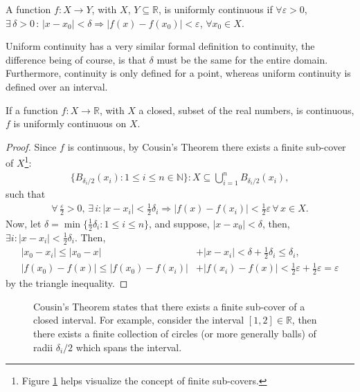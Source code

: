 \begin{definition}
A function $f: X \rightarrow Y$, with $X, \, Y \subseteq \mathbb{R}$, is uniformly continuous if $\forall \varepsilon > 0$, $\exists \, \delta > 0 \, : \, |x-x_0| < \delta \Rightarrow |f(x) - f(x_0)| < \varepsilon$, $ \forall x_0 \in X$.
\end{definition}

Uniform continuity has a very similar formal definition to continuity, the difference being of course, is that  $\delta$ must be the same for the entire domain. Furthermore, continuity is only defined for a point, whereas uniform continuity is defined over an interval.

\begin{theorem}[Heine-Cantor Theorem]
If a function $f: X \rightarrow \mathbb{R}$, with $X$ a closed, subset of the real numbers, is continuous, $f$ is uniformly continuous on $X$.
\label{thm:uniform}
\end{theorem}
\begin{proof}
Since $f$ is continuous, by Cousin's Theorem \cite{cousin} there exists a finite sub-cover of $X$\footnote[4]{Figure \ref{fig:arrows} helps visualize the concept of finite sub-covers.}:
\begin{align*}
\{ B_{\delta_i/2} (x_i) : 1 \leq i \leq n \in \mathbb{N} \} : X \subseteq \bigcup_{i=1}^n B_{\delta_i/2}(x_i),
\end{align*}
such that
\begin{align*}
\forall \, \frac{\varepsilon}{2} > 0, \, \exists \, i : |x-x_i| < \frac{1}{2} \delta_i \Rightarrow |f(x)-f(x_i)| < \frac{1}{2}\varepsilon \, \forall \, x \in X.
\end{align*}
Now, let $\delta = \min \{ \frac{1}{2} \delta_i : 1 \leq i \leq n \}$, and suppose, $|x-x_0| < \delta$, then, $\exists i : |x-x_i| < \frac{1}{2}\delta_i$.  Then,
\begin{align*}
|x_0-x_i| \leq |x_0-x| &+ |x-x_i| < \delta + \frac{1}{2}\delta_i \leq \delta_i, \\
|f(x_0)-f(x)| \leq |f(x_0)-f(x_i)| &+ |f(x_i)-f(x)| < \frac{1}{2}\varepsilon + \frac{1}{2}\varepsilon = \varepsilon
\end{align*}
by the triangle inequality.
\end{proof}

\begin{figure}[!p]
\centering

\caption[Cousin's Theorem Depiction]{Cousin's Theorem states that there exists a finite sub-cover of a closed interval. For example, consider the interval $[1,2] \in \mathbb{R}$, then there exists a finite collection of circles (or more generally balls) of radii $\delta_i/2$ which spans the interval.}
\label{fig:arrows}
\end{figure}

